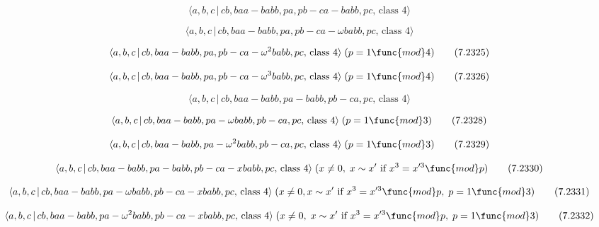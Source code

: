 \documentclass[10pt]{article}
\begin{document}
\begin{equation}
\langle a,b,c\,|\,cb,baa-babb,pa,pb-ca-babb,pc,\,\text{class }4\rangle 
\tag{7.2323}
\end{equation}

\begin{equation}
\langle a,b,c\,|\,cb,baa-babb,pa,pb-ca-\omega babb,pc,\,\text{class }4\rangle
\tag{7.2324}
\end{equation}

\begin{equation}
\langle a,b,c\,|\,cb,baa-babb,pa,pb-ca-\omega ^{2}babb,pc,\,\text{class }%
4\rangle \;(p=1\func{mod}4)  \tag{7.2325}
\end{equation}

\begin{equation}
\langle a,b,c\,|\,cb,baa-babb,pa,pb-ca-\omega ^{3}babb,pc,\,\text{class }%
4\rangle \;(p=1\func{mod}4)  \tag{7.2326}
\end{equation}

\begin{equation}
\langle a,b,c\,|\,cb,baa-babb,pa-babb,pb-ca,pc,\,\text{class }4\rangle 
\tag{7.2327}
\end{equation}

\begin{equation}
\langle a,b,c\,|\,cb,baa-babb,pa-\omega babb,pb-ca,pc,\,\text{class }%
4\rangle \;(p=1\func{mod}3)  \tag{7.2328}
\end{equation}

\begin{equation}
\langle a,b,c\,|\,cb,baa-babb,pa-\omega ^{2}babb,pb-ca,pc,\,\text{class }%
4\rangle \;(p=1\func{mod}3)  \tag{7.2329}
\end{equation}

\begin{equation}
\langle a,b,c\,|\,cb,baa-babb,pa-babb,pb-ca-xbabb,pc,\,\text{class }4\rangle
\;(x\neq 0,\;x\sim x^{\prime }\text{ if }x^{3}=x^{\prime 3}\func{mod}p) 
\tag{7.2330}
\end{equation}

\begin{equation}
\langle a,b,c\,|\,cb,baa-babb,pa-\omega babb,pb-ca-xbabb,pc,\,\text{class }%
4\rangle \;(x\neq 0,x \sim x^{\prime }\text{ if }x^3=x^{\prime 3}\func{mod}%
p,\;p=1\func{mod}3)  \tag{7.2331}
\end{equation}

\begin{equation}
\langle a,b,c\,|\,cb,baa-babb,pa-\omega ^{2}babb,pb-ca-xbabb,pc,\,\text{%
class }4\rangle \;(x\neq 0,\;x\sim x^{\prime }\text{ if }x^{3}=x^{\prime 3}%
\func{mod}p,\;p=1\func{mod}3)  \tag{7.2332}
\end{equation}
\end{document}
